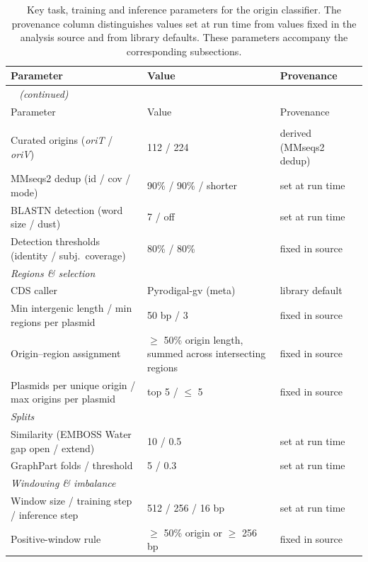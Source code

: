 {\small
\begin{longtable}{p{}p{}p{}}
\caption{
Key task, training and inference parameters for the origin classifier. The provenance column distinguishes values set at run time from values fixed in the analysis source and from library defaults. These parameters accompany the corresponding  subsections.
}\label{tab:origin-params}\\
\toprule
Parameter & Value & Provenance \\
\midrule
\endfirsthead
\multicolumn{3}{l}{\emph{\tablename~\thetable{} (continued)}}\\
\toprule
Parameter & Value & Provenance \\
\midrule
\endhead
\bottomrule
\endfoot
\multicolumn{3}{l}{\textit{Reference curation \& detection}} \\
Curated origins (\emph{oriT} / \emph{oriV}) & 112 / 224 & derived (MMseqs2 dedup) \\
MMseqs2 dedup (id / cov / mode) & 90\% / 90\% / shorter & set at run time \\
BLASTN detection (word size / dust) & 7 / off & set at run time \\
Detection thresholds (identity / subj.\ coverage) & 80\% / 80\% & fixed in source \\
\midrule
\multicolumn{3}{l}{\textit{Regions \& selection}} \\
CDS caller & Pyrodigal-gv (meta) & library default \\
Min intergenic length / min regions per plasmid & 50 bp / 3 & fixed in source \\
Origin--region assignment & $\geq$ 50\% origin length, summed across intersecting regions & fixed in source \\
Plasmids per unique origin / max origins per plasmid & top 5 / $\leq$ 5 & fixed in source \\
\midrule
\multicolumn{3}{l}{\textit{Splits}} \\
Similarity (EMBOSS Water gap open / extend) & 10 / 0.5 & set at run time \\
GraphPart folds / threshold & 5 / 0.3 & set at run time \\
\midrule
\multicolumn{3}{l}{\textit{Windowing \& imbalance}} \\
Window size / training step / inference step & 512 / 256 / 16 bp & set at run time \\
Positive-window rule & $\geq$ 50\% origin or $\geq$ 256 bp & fixed in source \\

\end{longtable}}
